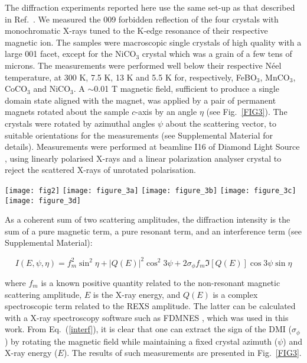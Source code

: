 \documentclass[aps,prl,showpacs,reprint,floatfix]{revtex4-1}
\begin{document}
The diffraction experiments reported here use the same set-up as that described in Ref.~\cite{DmitrienkoNP}.
We measured the 009 forbidden reflection of the four crystals with monochromatic X-rays tuned to the K-edge resonance of their respective magnetic ion.
The samples were macroscopic single crystals of high quality with a large 001 facet, except for the NiCO$_3$ crystal which was a grain of a few tens of microns.
The measurements were performed well below their respective N\'eel temperature, at 300 K, 7.5 K, 13 K and 5.5 K for, respectively, FeBO$_3$, MnCO$_3$, CoCO$_3$ and NiCO$_3$.
A $\sim$0.01 T magnetic field, sufficient to produce a single domain state aligned with the magnet, 
was applied by a pair of permanent magnets rotated about the sample $c$-axis by an angle $\eta$ (see Fig.~\ref{FIG3}).
The crystals were rotated by azimuthal angles $\psi$ about the scattering vector, to 
suitable orientations for the measurements (see Supplemental Material for details).
Measurements were performed at beamline I16 of Diamond Light Source \cite{I16}, using linearly polarised X-rays and a linear polarization analyser crystal to 
reject the scattered X-rays of unrotated polarisation. 

\begin{figure*}[!ht]
 \texttt{[image: fig2]}
 \texttt{[image: figure\_3a]}
 \texttt{[image: figure\_3b]}
 \texttt{[image: figure\_3c]}
 \texttt{[image: figure\_3d]}
 \caption{
 X-ray diffraction experiment: schematic view and main results.
 Normalized experimental values of the diffraction intensity $versus$ magnet angle $\eta$, for the series of weak ferromagnets. 
 The blue curves are measured below the resonance energy and show the pure magnetic scattering intensity, which is symmetric and insensitive to the scattering phase. 
 The red curves are on resonance and include a strong interference term that breaks the symmetry and gives the phase of the magnetic scattering, revealing the sign of the DMI.
}
 \label{FIG3}
\end{figure*}

As a coherent sum of two scattering amplitudes, the diffraction intensity is the sum of a pure magnetic term, a pure resonant term, and an interference term
(see Supplemental Material):
\begin{widetext}
\begin{equation}
 I(E,\psi,\eta) = f_m^2 \sin^2\eta + \left|Q(E)\right|^2 \cos^2 3\psi + 2 \sigma_\phi f_m \Im\left[Q(E)\right] \cos3\psi \sin\eta
 \label{interf}
\end{equation}
\end{widetext}
where $f_m$ is a known positive quantity related to the non-resonant magnetic scattering amplitude, $E$ is the X-ray energy, and $Q(E)$ is a complex spectroscopic term related to the REXS amplitude. 
The latter can be calculated with a X-ray spectroscopy software such as FDMNES \cite{FDMNES}, which was used in this work.
From Eq.~(\ref{interf}), it is clear that one can extract the sign of the DMI ($\sigma_\phi$) by rotating the magnetic field while maintaining a fixed crystal 
azimuth ($\psi$) and X-ray energy ($E$). 
The results of such measurements are presented in Fig.~\ref{FIG3}.
\end{document}
